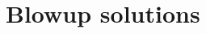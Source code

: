 \documentclass[11pt,a4paper]{amsart}
\theoremstyle{definition}
\numberwithin{equation}{section}
\newcommand{\mR}{\mathbb{R}}                    %
\newcommand{\abs}[1]{\lvert #1 \rvert}          %
\newcommand{\eps}{\varepsilon}
\newcommand{\p}{\partial}
\begin{document}

\section{Blowup solutions} \label{sec_blowup_solutions}
\end{document}
